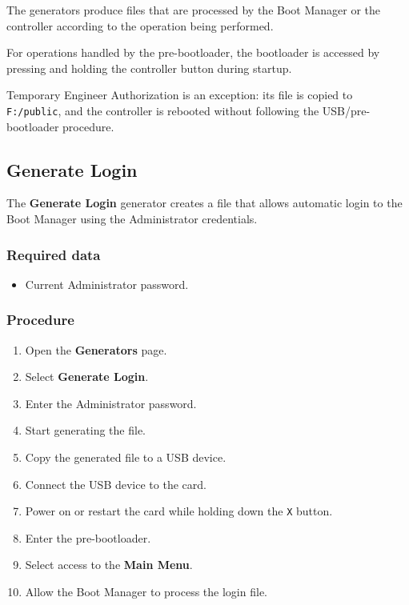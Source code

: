 ﻿\documentclass[11pt,a4paper]{article}
\newcommand{\button}[1]{\textbf{#1}}
\newcommand{\filename}[1]{\texttt{#1}}
\begin{document}
The generators produce files that are processed by the Boot Manager
or the controller according to the operation being performed.

For operations handled by the pre-bootloader, the bootloader is
accessed by pressing and holding the controller button during startup.

Temporary Engineer Authorization is an exception: its file is
copied to \filename{F:/public}, and the controller is rebooted
without following the USB/pre-bootloader procedure.

\subsection{Generate Login}

The \button{Generate Login} generator creates a file that allows
automatic login to the Boot Manager using the Administrator
credentials.

\subsubsection*{Required data}

\begin{itemize}
    \item Current Administrator password.
\end{itemize}

\subsubsection*{Procedure}

\begin{enumerate}
    \item Open the \button{Generators} page.
    \item Select \button{Generate Login}.
    \item Enter the Administrator password.
    \item Start generating the file.
    \item Copy the generated file to a USB device.
    \item Connect the USB device to the card.
    \item Power on or restart the card while holding down
    the \texttt{X} button.
    \item Enter the pre-bootloader.
    \item Select access to the \textbf{Main Menu}.
    \item Allow the Boot Manager to process the login file.
\end{enumerate}
\end{document}
